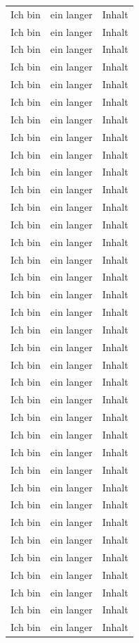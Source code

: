 \documentclass[
12pt,
ngerman
]{scrreprt}
\begin{document}
\begin{longtable}{lcl}
  Ich bin & ein langer & Inhalt \\
  Ich bin & ein langer & Inhalt \\
  Ich bin & ein langer & Inhalt \\
  Ich bin & ein langer & Inhalt \\
  Ich bin & ein langer & Inhalt \\
  Ich bin & ein langer & Inhalt \\
  Ich bin & ein langer & Inhalt \\
  Ich bin & ein langer & Inhalt \\
  Ich bin & ein langer & Inhalt \\
  Ich bin & ein langer & Inhalt \\
  Ich bin & ein langer & Inhalt \\
  Ich bin & ein langer & Inhalt \\
  Ich bin & ein langer & Inhalt \\
  Ich bin & ein langer & Inhalt \\
  Ich bin & ein langer & Inhalt \\
  Ich bin & ein langer & Inhalt \\
  Ich bin & ein langer & Inhalt \\
  Ich bin & ein langer & Inhalt \\
  Ich bin & ein langer & Inhalt \\
  Ich bin & ein langer & Inhalt \\
  Ich bin & ein langer & Inhalt \\
  Ich bin & ein langer & Inhalt \\
  Ich bin & ein langer & Inhalt \\
  Ich bin & ein langer & Inhalt \\
  Ich bin & ein langer & Inhalt \\
  Ich bin & ein langer & Inhalt \\
  Ich bin & ein langer & Inhalt \\
  Ich bin & ein langer & Inhalt \\
  Ich bin & ein langer & Inhalt \\
  Ich bin & ein langer & Inhalt \\
  Ich bin & ein langer & Inhalt \\
  Ich bin & ein langer & Inhalt \\
  Ich bin & ein langer & Inhalt \\
  Ich bin & ein langer & Inhalt \\
  Ich bin & ein langer & Inhalt \\
  Ich bin & ein langer & Inhalt \\
\end{longtable}
\end{document}
